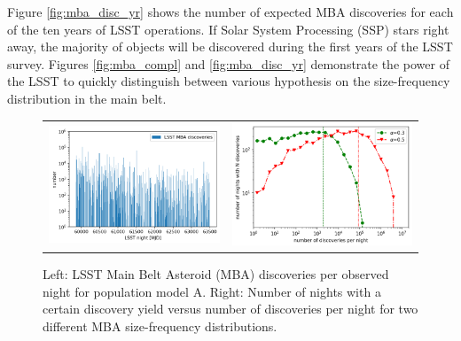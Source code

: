 Figure \ref{fig:mba_disc_yr} shows the number of expected \gls{MBA} discoveries for each of the ten years of \gls{LSST} operations. If Solar System Processing (\gls{SSP}) stars right away, the majority of objects will be discovered during the first years of the \gls{LSST} survey. Figures \ref{fig:mba_compl} and \ref{fig:mba_disc_yr} demonstrate the power of the \gls{LSST} to quickly distinguish between various hypothesis on the size-frequency distribution in the main belt. 
%
\begin{figure}[tb!]
\begin{center}
\begin{tabular}{cc}
\includegraphics[width=0.5\linewidth]{figs/disc_per_night.png} &
\includegraphics[width=0.50\linewidth]{figs/disc_stat.png}
\end{tabular}
\end{center}
\caption{Left: \gls{LSST} Main Belt Asteroid (\gls{MBA}) discoveries per observed night for population model A. Right: Number of nights with a certain discovery yield versus number of discoveries per night for two different \gls{MBA} size-frequency distributions.}
\label{fig:mba_disc_stats}       %
\end{figure}

